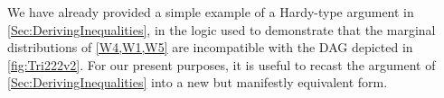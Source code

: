 {%

We have already provided a simple example of a Hardy-type argument in \cref{Sec:DerivingInequalities}, in the logic used to demonstrate that the marginal distributions of \cref{W4,W1,W5} are incompatible with the DAG depicted in \cref{fig:Tri222v2}.   For our present purposes, it is useful to recast the argument of \cref{Sec:DerivingInequalities} into a new but manifestly equivalent form.    

}
